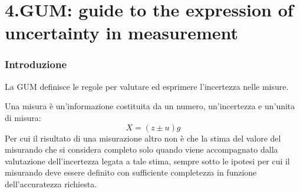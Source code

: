 \documentclass[a4paper, 15pt]{article}
\begin{document}
				\setcounter{tocdepth}{5} %
				\tableofcontents 
				\newpage
				
\part{4.GUM: guide to the expression of uncertainty in measurement}
\section{Introduzione}	
\begin{adjustwidth}{2in}{}
		La GUM definisce le regole per valutare ed esprimere l’incertezza nelle
		misure. \newline
		
		Una misura è un'informazione costituita da un numero, un'incertezza e un'unita di misura:
		\[X = (z \pm u)g\]
		Per cui il risultato di una misurazione altro non è che la stima del valore del misurando che si considera completo solo quando viene accompagnato dalla valutazione
		dell’incertezza legata a tale stima, sempre sotto le ipotesi per cui il misurando deve essere definito con sufficiente completezza in funzione dell'accuratezza richiesta. 
\end{adjustwidth}
\end{document}
